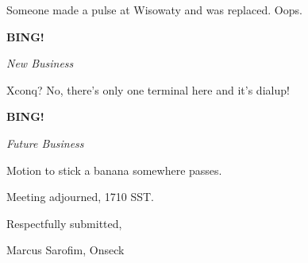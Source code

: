 \documentclass[12pt]{article}
\newcommand{\bing}{{\bf BING!} }
\newcommand{\goto}[1]{\bing \vskip 12pt \centerline{{\em{#1}}}}
\begin{document}
Someone made a pulse at Wisowaty and was replaced. Oops.

\goto{New Business}

Xconq? No, there's only one terminal here and it's dialup!

\goto{Future Business}

Motion to stick a banana somewhere passes.

\vspace{12pt}

\noindent
Meeting adjourned, 1710 SST.

\vspace{18pt}

\centerline{Respectfully submitted,}
\centerline{Marcus Sarofim, Onseck}
\end{document}
